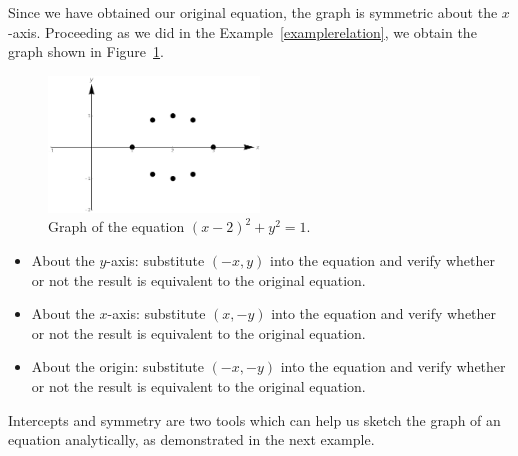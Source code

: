 \begin{example}
	Since we have obtained our original equation, the graph is symmetric about the $x$-axis. Proceeding as we did in the Example~\ref{examplerelation}, we obtain the graph shown in Figure~\ref{fig_functions_7}.
	
	
	\begin{figure}[H]
		\begin{center}
			\includegraphics[width=0.5\textwidth]{fig_functions_7}
			\caption{Graph of the equation $(x-2)^2 + y^2 = 1$.}
			\label{fig_functions_7}
		\end{center}
	\end{figure}
	
\end{example}
\fi


\ifvc
\begin{itemize}

\item About the $y$-axis: substitute $(-x,y)$ into the equation and verify whether or not the result is equivalent to the original equation.

\item About the $x$-axis: substitute $(x,-y)$ into the equation   and verify whether or not the result is equivalent to the original equation.

\item About the origin: substitute $(-x,-y)$ into the equation and verify whether or not the result is equivalent to the original equation.

\end{itemize}

Intercepts and symmetry are two tools which can help us sketch the graph of an equation analytically, as demonstrated in the next example.


